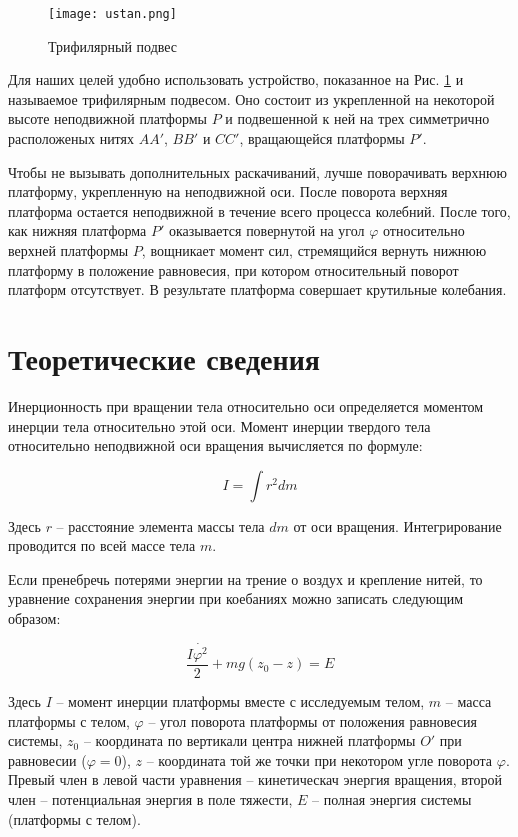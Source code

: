 \documentclass[a4paper,14pt]{extarticle}
\begin{document}
	\begin{figure}
		\texttt{[image: ustan.png]}
		\caption{Трифилярный подвес}
		\label{ust}
	\end{figure}
	
	Для наших целей удобно использовать устройство, показанное на Рис. \ref{ust} и называемое трифилярным подвесом. Оно состоит из укрепленной на некоторой высоте неподвижной платформы $P$ и подвешенной к ней на трех симметрично расположеных нитях $AA'$, $BB'$ и $CC'$, вращающейся платформы $P'$. 
	
	Чтобы не вызывать дополнительных раскачиваний, лучше поворачивать верхнюю платформу, укрепленную на неподвижной оси. После поворота верхняя платформа остается неподвижной в течение всего процесса колебний. После того, как нижняя платформа $P'$ оказывается повернутой на угол $\varphi$ относительно верхней платформы $P$, вощникает момент сил, стремящийся вернуть нижнюю платформу в положение равновесия, при котором относительный поворот платформ отсутствует. В результате платформа совершает крутильные колебания.
	
	\section{Теоретические сведения}
	
	\par Инерционность при вращении тела относительно оси определяется моментом инерции тела относительно этой оси. Момент инерции твердого тела относительно неподвижной оси вращения вычисляется по формуле:
	
	\begin{equation}
		I = \int r^2 dm
	\end{equation}
	
	Здесь $r$ -- расстояние элемента массы тела $dm$ от оси вращения. Интегрирование проводится по всей массе тела $m$.
	
	Если пренебречь потерями энергии на трение о воздух и крепление нитей, то уравнение сохранения энергии при коебаниях можно записать следующим образом:
	
	\begin{equation}\label{moment}
		\frac{I \dot{\varphi^2}}{2} + mg(z_0-z) = E
	\end{equation}
	
	Здесь $I$ -- момент инерции платформы вместе с исследуемым телом, $m$ -- масса платформы с телом, $\varphi$ -- угол поворота платформы от положения равновесия системы, $z_0$ -- координата по вертикали центра нижней платформы $O'$  при равновесии ($\varphi = 0$), $z$ -- координата той же точки при некотором угле поворота $\varphi$. Превый член в левой части уравнения -- кинетическач энергия вращения, второй член -- потенциальная энергия в поле тяжести, $E$ -- полная энергия системы (платформы с телом).
	
\end{document}
